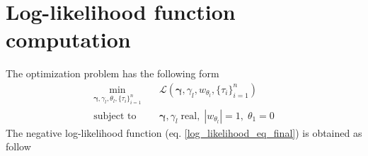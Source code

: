\section*{Log-likelihood function computation} 
\noindent The optimization problem has the following form 
\begin{equation*}
    \begin{aligned}
        \min_{\boldsymbol{\gamma}, \gamma_{l}, \theta_{l}, \{\tau_i\}_{i=1}^n} \quad & \mathcal{L}(\boldsymbol{\gamma}, \gamma_{l}, w_{\theta_{l}}, \{\tau_i\}_{i=1}^n) \\
        \text{subject to} \quad & \boldsymbol{\gamma}, \gamma_{l} \; \text{real}, \; |w_{\theta_{l}}| = 1, \; \theta_1 = 0
    \end{aligned}
\end{equation*}
The negative log-likelihood function (eq. \ref{log_likelihood_eq_final}) is obtained as follow
